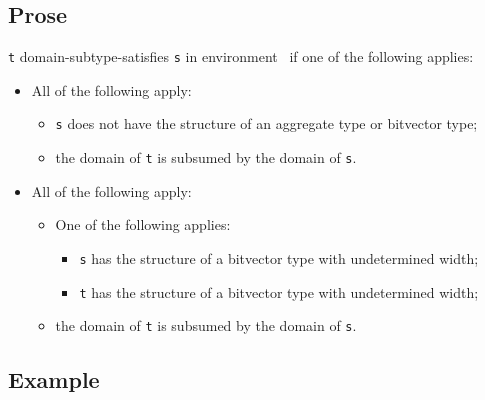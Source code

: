 \documentclass{book}
\begin{document}
\subsection{Prose}
 \texttt{t} domain-subtype-satisfies \texttt{s} in environment \tenv\ if one of the following applies:
 \begin{itemize}
 \item All of the following apply:
    \begin{itemize}
    \item \texttt{s} does not have the structure of an aggregate type or bitvector type;
    \item the domain of \texttt{t} is subsumed by the domain of \texttt{s}.
    \end{itemize}

  \item All of the following apply:
  \begin{itemize}
    \item One of the following applies:
      \begin{itemize}
      \item \texttt{s} has the structure of a bitvector type with undetermined width;
      \item \texttt{t} has the structure of a bitvector type with undetermined width;
      \end{itemize}
   \item the domain of \texttt{t} is subsumed by the domain of \texttt{s}.
   \end{itemize}
  \end{itemize}

  \subsection{Example}


\end{document}
